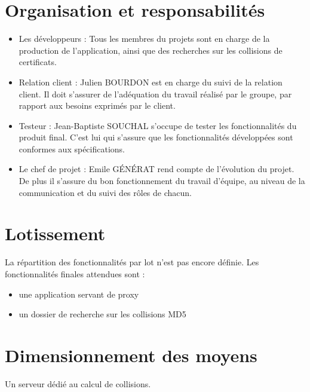 \documentclass[a4paper,11pt,french]{article}
\begin{document}
\newpage
\section{Organisation et responsabilités}

\begin{itemize}
\item Les développeurs : Tous les membres du projets sont en charge de la production de l'application, ainsi que des recherches sur les collisions de certificats.

\item Relation client : Julien BOURDON est en charge du suivi de la relation client. Il doit s'assurer de l'adéquation du travail réalisé par le groupe, par rapport aux besoins exprimés par le client.

\item Testeur : Jean-Baptiste SOUCHAL s'occupe de tester les fonctionnalités du produit final. C'est lui qui s'assure que les fonctionnalités développées sont conformes aux spécifications.

\item Le chef de projet : Emile GÉNÉRAT rend compte de l'évolution du projet. De plus il s'assure du bon fonctionnement du travail d'équipe, au niveau de la communication et du suivi des rôles de chacun.
\end{itemize}

\newpage
\section{Lotissement}

La répartition des fonctionnalités par lot n'est pas encore définie.
Les fonctionnalités finales attendues sont :
\begin{itemize}
\item une application servant de proxy  
\item un dossier de recherche sur les collisions MD5
\end{itemize}


\newpage
\section{Dimensionnement des moyens}

Un serveur dédié au calcul de collisions.
\end{document}
